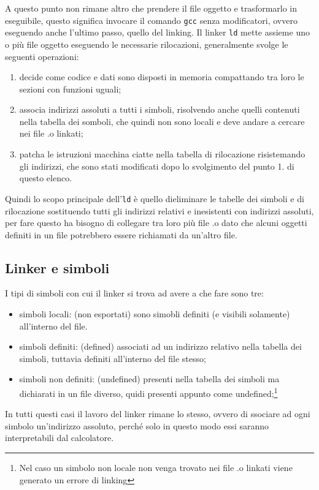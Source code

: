 \documentclass[class=book, crop=false, oneside]{standalone}
\begin{document}
A questo punto non rimane altro che prendere il file oggetto e trasformarlo in eseguibile, questo significa invocare il comando \texttt{gcc} senza modificatori, ovvero eseguendo anche l'ultimo passo, quello del linking.
Il linker \texttt{ld} mette assieme uno o più file oggetto eseguendo le necessarie rilocazioni, generalmente svolge le seguenti operazioni:
\begin{enumerate}
	\item decide come codice e dati sono disposti in memoria compattando tra loro le sezioni con funzioni uguali;
	\item associa indirizzi assoluti a tutti i simboli, risolvendo anche quelli contenuti nella tabella dei somboli, che quindi non sono locali e deve andare a cercare nei file .o linkati;
	\item patcha le istruzioni macchina ciatte nella tabella di rilocazione risistemando gli indirizzi, che sono stati modificati dopo lo svolgimento del punto 1. di questo elenco.
\end{enumerate}

Quindi lo scopo principale dell'\texttt{ld} è quello dieliminare le tabelle dei simboli e di rilocazione sostituendo tutti gli indirizzi relativi e inesistenti con indirizzi assoluti, per fare questo ha bisogno di collegare tra loro più file .o dato che alcuni oggetti definiti in un file potrebbero essere richiamati da un'altro file.

\subsection{Linker e simboli}

I tipi di simboli con cui il linker si trova ad avere a che fare sono tre:
\begin{itemize}
	\item simboli locali: (non esportati) sono simobli definiti (e visibili solamente) all'interno del file.
	\item simboli definiti: (defined) associati ad un indirizzo relativo nella tabella dei simboli, tuttavia definiti all'interno del file stesso;
	\item simboli non definiti: (undefined) presenti nella tabella dei simboli ma dichiarati in un file diverso, quidi presenti appunto come undefined;\footnote{Nel caso un simbolo non locale non venga trovato nei file .o linkati viene generato un errore di linking}
\end{itemize}

In tutti questi casi il lavoro del linker rimane lo stesso, ovvero di ssociare ad ogni simbolo un'indirizzo assoluto, perché solo in questo modo essi saranno interpretabili dal calcolatore.
\end{document}
